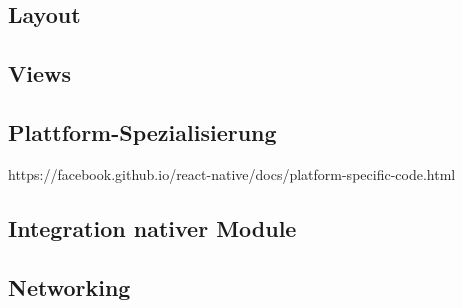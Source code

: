\subsection{Layout}

\subsection{Views}

\subsection{Plattform-Spezialisierung}
https://facebook.github.io/react-native/docs/platform-specific-code.html

\subsection{Integration nativer Module}

\subsection{Networking}
